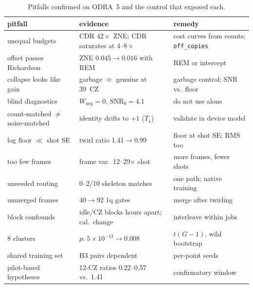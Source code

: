 \documentclass[conference]{IEEEtran}
\newcommand{\arm}[1]{\texttt{#1}}
\begin{document}
\begin{table}[t]
\caption{Pitfalls confirmed on ODRA~5 and the control that exposed each.}
\label{tab:pitfalls}
\centering\footnotesize
\setlength{\tabcolsep}{3pt}
\begin{tabular}{@{}L{0.29\columnwidth}L{0.36\columnwidth}L{0.29\columnwidth}@{}}
\toprule
pitfall & evidence & remedy \\
\midrule
unequal budgets & CDR $42\times$ ZNE; CDR saturates at $4$--$8\times$ & cost curves from counts; \arm{off\_copies} \\
offset passes Richardson & ZNE $0.045\to0.016$ with REM & REM or intercept \\
collapse looks like gain & garbage $\approx$ genuine at 39~CZ & garbage control; SNR vs.\ floor \\
blind diagnostics & $W_{\text{neg}}=0$, SNR$_0=4.1$ & do not use alone \\
count-matched $\neq$ noise-matched & identity drifts to $+1$ ($T_1$) & validate in device model \\
log floor $\ll$ shot SE & twirl ratio 1.41$\to$0.99 & floor at shot SE; RMS too \\
too few frames & frame var.\ 12--29$\times$ shot & more frames, fewer shots \\
unseeded routing & 0--2/10 skeleton matches & one path; native training \\
unmerged frames & 40$\to$92 1q gates & merge after twirling \\
block confounds & idle/CZ blocks hours apart; cal.\ change & interleave within jobs \\
8 clusters & $p$: $5\!\times\!10^{-13}\to0.008$ & $t(G-1)$, wild bootstrap \\
shared training set & H3 pairs dependent & per-point seeds \\
pilot-based hypotheses & 12-CZ ratios 0.22--0.57 vs.\ 1.41 & confirmatory window \\
\bottomrule
\end{tabular}
\end{table}
\end{document}
